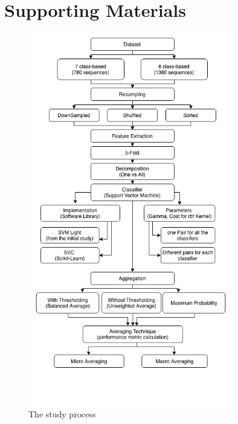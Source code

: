 \section{Supporting Materials}
\label{sec:supporingMaterials}

\begin{figure}[ht]
    \begin{adjustwidth}{-1.0in}{40in}
    \centering
    \includegraphics[width=0.80\textwidth]{figures/13studyProcess.jpg}
    \captionsetup{font=footnotesize,width=10cm, justification=centering}
    \caption{The study process}
    \label{fig:studyProcess}
\end{adjustwidth}
\end{figure}












